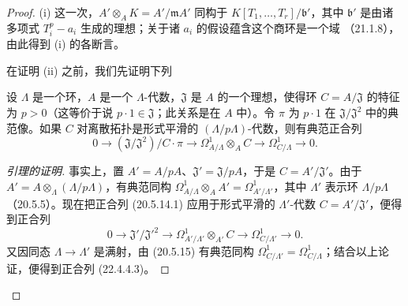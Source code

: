 \begin{proof}
(i) 这一次，$A'\otimes_AK=A'/\mathfrak mA'$ 同构于
$K[T_1,\ldots,T_r]/\mathfrak b'$，其中 $\mathfrak b'$ 是由诸多项式
$T_i^p-a_i$ 生成的理想；关于诸 $a_i$ 的假设蕴含这个商环是一个域
（21.1.8），由此得到 (i) 的各断言。

在证明 (ii) 之前，我们先证明下列

\begin{lemma}[22.4.4.2]
\label{0.22.4.4.2-fr}
设 $\Lambda$ 是一个环，$A$ 是一个 $\Lambda$-代数，$\mathfrak J$ 是
$A$ 的一个理想，使得环 $C=A/\mathfrak J$ 的特征为 $p>0$（这等价于说
$p\cdot1\in\mathfrak J$；此关系是在 $A$ 中）。令 $\pi$ 为 $p\cdot1$ 在
$\mathfrak J/\mathfrak J^2$ 中的典范像。如果 $C$ 对离散拓扑是形式平滑的
$(\Lambda/p\Lambda)$-代数，则有典范正合列
\begin{equation}
\label{0.22.4.4.3-fr}
  0\longrightarrow(\mathfrak J/\mathfrak J^2)/C\cdot\pi
  \longrightarrow\Omega^1_{A/\Lambda}\otimes_AC
  \longrightarrow\Omega^1_{C/\Lambda}\longrightarrow0.
  \tag{22.4.4.3}
\end{equation}
\end{lemma}

\begin{proof}[引理的证明]
事实上，置 $A'=A/pA$、$\mathfrak J'=\mathfrak J/pA$，于是
$C=A'/\mathfrak J'$。由于
$A'=A\otimes_\Lambda(\Lambda/p\Lambda)$，有典范同构
$\Omega^1_{A/\Lambda}\otimes_AA'=\Omega^1_{A'/\Lambda'}$，其中
$\Lambda'$ 表示环 $\Lambda/p\Lambda$（20.5.5）。现在把正合列
(20.5.14.1) 应用于形式平滑的 $\Lambda'$-代数
$C=A'/\mathfrak J'$，便得到正合列
\[
  0\longrightarrow\mathfrak J'/\mathfrak J'^2
  \longrightarrow\Omega^1_{A'/\Lambda'}\otimes_{A'}C
  \longrightarrow\Omega^1_{C/\Lambda'}\longrightarrow0.
\]
又因同态 $\Lambda\to\Lambda'$ 是满射，由 (20.5.15) 有典范同构
$\Omega^1_{C/\Lambda'}=\Omega^1_{C/\Lambda}$；结合以上论证，便得到正合列
(22.4.4.3)。
\end{proof}


\end{proof}
